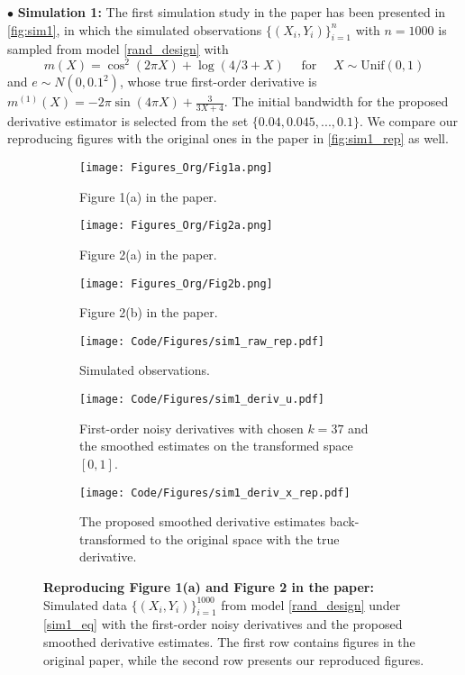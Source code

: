 \documentclass{uwstat572}
\theoremstyle{definition}
\theoremstyle{theorem}
\begin{document}
\indent $\bullet$ {\bf Simulation 1:} The first simulation study in the paper \citep{liu2020smoothed} has been presented in \autoref{fig:sim1}, in which the simulated observations $\{(X_i,Y_i)\}_{i=1}^n$ with $n=1000$ is sampled from model \eqref{rand_design} with
\begin{equation}
\label{sim1_eq}
m(X) = \cos^2(2\pi X) + \log(4/3 +X) \quad \text{ for } \quad X\sim \mathrm{Unif}(0,1)
\end{equation}
and $e\sim N(0,0.1^2)$, whose true first-order derivative is $m^{(1)}(X)=-2\pi \sin(4\pi X) + \frac{3}{3X+4}$. The initial bandwidth for the proposed derivative estimator is selected from the set $\{0.04, 0.045,...,0.1\}$. We compare our reproducing figures with the original ones in the paper in \autoref{fig:sim1_rep} as well.

\begin{figure}[t]
	\captionsetup[subfigure]{justification=centering}
	\begin{subfigure}[t]{0.32\linewidth}
		\centering
		\texttt{[image: Figures\_Org/Fig1a.png]}
		\caption{Figure 1(a) in the paper.}
	\end{subfigure}
	\hfil
	\begin{subfigure}[t]{0.32\linewidth}
		\centering
		\texttt{[image: Figures\_Org/Fig2a.png]}
		\caption{Figure 2(a) in the paper.}
	\end{subfigure}
    \hfil
    \begin{subfigure}[t]{0.32\linewidth}
    	\centering
    	\texttt{[image: Figures\_Org/Fig2b.png]}
    	\caption{Figure 2(b) in the paper.}
    \end{subfigure}
    \begin{subfigure}[t]{0.32\linewidth}
    	\centering
    	\texttt{[image: Code/Figures/sim1\_raw\_rep.pdf]}
    	\caption{Simulated observations.}
    \end{subfigure}
    \hfil
    \begin{subfigure}[t]{0.32\linewidth}
    	\centering
    	\texttt{[image: Code/Figures/sim1\_deriv\_u.pdf]}
    	\caption{First-order noisy derivatives with chosen $k=37$ and the smoothed estimates on the transformed space $[0,1]$.}
    \end{subfigure}
    \hfil
    \begin{subfigure}[t]{0.32\linewidth}
    	\centering
    	\texttt{[image: Code/Figures/sim1\_deriv\_x\_rep.pdf]}
    	\caption{The proposed smoothed derivative estimates back-transformed to the original space with the true derivative.}
    \end{subfigure}
	\caption{{\bf Reproducing Figure 1(a) and Figure 2 in the paper:} Simulated data $\{(X_i,Y_i)\}_{i=1}^{1000}$ from model \eqref{rand_design} under \eqref{sim1_eq} with the first-order noisy derivatives and the proposed smoothed derivative estimates. The first row contains figures in the original paper, while the second row presents our reproduced figures.}
	\label{fig:sim1_rep}
\end{figure}
\end{document}
